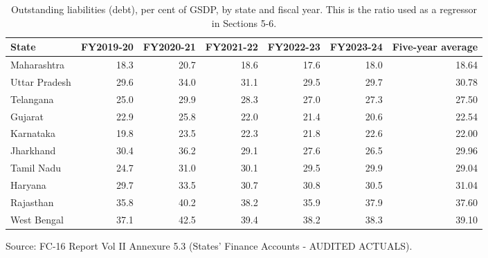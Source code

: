 \documentclass[12pt,a4paper]{article}
\begin{document}
\begin{table}[H]
\centering
\caption{Outstanding liabilities (debt), per cent of GSDP, by state and fiscal year. This is the ratio used as a regressor in Sections 5-6.}
\label{tab:4}
\footnotesize
\begin{adjustbox}{max width=\textwidth}
\begin{tabular}{@{}lrrrrrr@{}}
\toprule
State & FY2019-20 & FY2020-21 & FY2021-22 & FY2022-23 & FY2023-24 & Five-year average \\
\midrule
Maharashtra & 18.3 & 20.7 & 18.6 & 17.6 & 18.0 & 18.64 \\
Uttar Pradesh & 29.6 & 34.0 & 31.1 & 29.5 & 29.7 & 30.78 \\
Telangana & 25.0 & 29.9 & 28.3 & 27.0 & 27.3 & 27.50 \\
Gujarat & 22.9 & 25.8 & 22.0 & 21.4 & 20.6 & 22.54 \\
Karnataka & 19.8 & 23.5 & 22.3 & 21.8 & 22.6 & 22.00 \\
Jharkhand & 30.4 & 36.2 & 29.1 & 27.6 & 26.5 & 29.96 \\
Tamil Nadu & 24.7 & 31.0 & 30.1 & 29.5 & 29.9 & 29.04 \\
Haryana & 29.7 & 33.5 & 30.7 & 30.8 & 30.5 & 31.04 \\
Rajasthan & 35.8 & 40.2 & 38.2 & 35.9 & 37.9 & 37.60 \\
West Bengal & 37.1 & 42.5 & 39.4 & 38.2 & 38.3 & 39.10 \\
\bottomrule
\end{tabular}
\end{adjustbox}
\end{table}

Source: FC-16 Report Vol II Annexure 5.3 (States' Finance Accounts - AUDITED ACTUALS).
\end{document}
